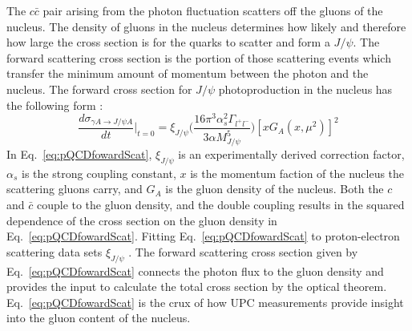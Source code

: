     The $c\bar{c}$ pair arising from the photon fluctuation scatters off the 
      gluons of the nucleus. 
    The density of gluons in the nucleus determines how likely and therefore 
      how large the cross section is for the quarks to scatter and form a 
      $J/\psi$.
    The forward scattering cross section is the portion of those scattering 
      events which transfer the minimum amount of momentum between the 
      photon and the nucleus. 
    The forward cross section for $J/\psi$ photoproduction in the nucleus has 
      the following form \cite{pQCD2011.08}:
    \begin{equation} \label{eq:pQCDfowardScat}
      \frac{d\sigma_{\gamma A\rightarrow J/\psi A}}{dt}\Big|_{t=0}=\xi_{J/\psi}
        \Big(\frac{16\pi^{3}\alpha_{s}^{2}\Gamma_{l^{+}l^{-}}}{3\alpha 
        M_{J/\psi}^{5}}\Big)[xG_{A}(x,\mu^{2})]^{2}
    \end{equation}
    In Eq.~\ref{eq:pQCDfowardScat}, $\xi_{J/\psi}$ is an experimentally derived 
      correction factor, $\alpha_{s}$ is the strong coupling constant, $x$ is 
      the momentum faction of the nucleus the scattering gluons carry, and 
      $G_{A}$ is the gluon density of the nucleus. 
    Both the $c$ and $\bar{c}$ couple to the gluon density, and the double 
      coupling results in the squared dependence of the cross section on the 
      gluon density in Eq.~\ref{eq:pQCDfowardScat}. 
    Fitting Eq.~\ref{eq:pQCDfowardScat} to proton-electron scattering data 
      sets $\xi_{J/\psi}$ \cite{pQCD2011.08}.
    The forward scattering cross section given by Eq.~\ref{eq:pQCDfowardScat} 
      connects the photon flux to the gluon density and provides the input to 
      calculate the total cross section by the optical theorem. 
    Eq.~\ref{eq:pQCDfowardScat} is the crux of how UPC measurements provide
      insight into the gluon content of the nucleus.
    

